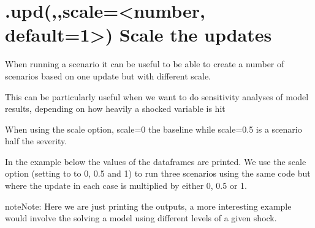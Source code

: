 \documentclass[letterpaper,10pt,english]{jupyterBook}
\begin{document}
\section{.upd(,,scale=<number, default=1>) Scale the updates}
\label{\detokenize{content/04_PythonEssentials/UpdateCommand:upd-scale-number-default-1-scale-the-updates}}
\sphinxAtStartPar
When running a scenario it can be useful to be able to create a number of scenarios based on one update but with different scale.

\sphinxAtStartPar
This can be particularly useful when we want to do sensitivity analyses of model results, depending on how heavily a shocked variable is hit

\sphinxAtStartPar
When using the scale option, scale=0  the baseline while scale=0.5 is a scenario half
the severity.

\sphinxAtStartPar
In the example below the values of the dataframes are printed. We use the scale option (setting to to 0, 0.5 and 1) to run three scenarios using the same code but where the update in each case is multiplied by either 0, 0.5 or 1.

\begin{sphinxadmonition}{note}{Note:}
\sphinxAtStartPar
Here we are just printing the outputs, a more interesting example would involve the solving a  model using different levels of a given shock.
\end{sphinxadmonition}
\end{document}
